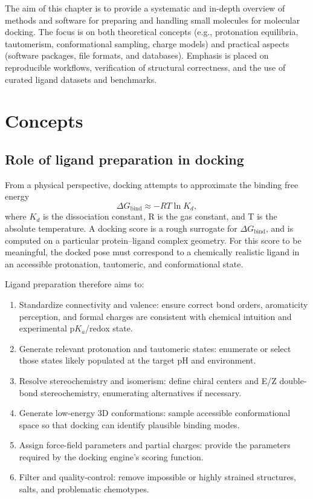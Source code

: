 \documentclass[12pt, a4paper]{article}
\begin{document}
The aim of this chapter is to provide a systematic and in-depth overview of methods and software for preparing and handling small molecules for molecular docking. The focus is on both theoretical concepts (e.g., protonation equilibria, tautomerism, conformational sampling, charge models) and practical aspects (software packages, file formats, and databases). Emphasis is placed on reproducible workflows, verification of structural correctness, and the use of curated ligand datasets and benchmarks. 

\section{Concepts}

\subsection{Role of ligand preparation in docking}

From a physical perspective, docking attempts to approximate the binding free energy
\[
\Delta G_{\mathrm{bind}} \approx -RT \ln K_d,
\]
where $K_d$ is the dissociation constant, R is the gas constant, and T is the absolute temperature. A docking score is a rough surrogate for $\Delta G_{\mathrm{bind}}$, and is computed on a particular protein--ligand complex geometry.\cite{CH6_KeyTopicsDocking} For this score to be meaningful, the docked pose must correspond to a chemically realistic ligand in an accessible protonation, tautomeric, and conformational state. 

Ligand preparation therefore aims to:
\begin{enumerate}
  \item Standardize connectivity and valence: ensure correct bond orders, aromaticity perception, and formal charges are consistent with chemical intuition and experimental p$K_a$/redox state.
  \item Generate relevant protonation and tautomeric states: enumerate or select those states likely populated at the target pH and environment.
  \item Resolve stereochemistry and isomerism: define chiral centers and E/Z double-bond stereochemistry, enumerating alternatives if necessary.
  \item Generate low-energy 3D conformations: sample accessible conformational space so that docking can identify plausible binding modes.
  \item Assign force-field parameters and partial charges: provide the parameters required by the docking engine's scoring function.
  \item Filter and quality-control: remove impossible or highly strained structures, salts, and problematic chemotypes.
\end{enumerate}
\end{document}

